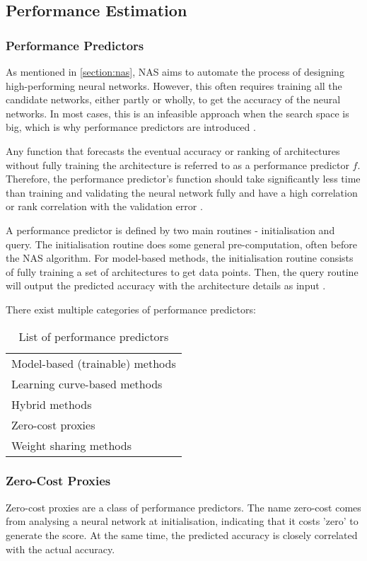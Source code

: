 \subsection{Performance Estimation}
\subsubsection{Performance Predictors}\label{sec:performancepredictors}
As mentioned in \cref{section:nas}, NAS aims to automate the process of designing high-performing neural networks. However, this often requires training all the candidate networks, either partly or wholly, to get the accuracy of the neural networks. In most cases, this is an infeasible approach when the search space is big, which is why performance predictors are introduced \autocite{akhauri2022evolving}. 

Any function that forecasts the eventual accuracy or ranking of architectures without fully training the architecture is referred to as a performance predictor $f$. Therefore, the performance predictor's function should take significantly less time than training and validating the neural network fully and have a high correlation or rank correlation with the validation error \autocite{white2021powerful}. 

A performance predictor is defined by two main routines - initialisation and query. The initialisation routine does some general pre-computation, often before the NAS algorithm. For model-based methods, the initialisation routine consists of fully training a set of architectures to get data points. Then, the query routine will output the predicted accuracy with the architecture details as input \autocite{white2021powerful}. 

There exist multiple categories of performance predictors:

\begin{table}[h]
\caption{List of performance predictors}
\centering
\begin{tabular}{|l}
Model-based (trainable) methods \\
\cellcolor{verylightgray}Learning curve-based methods    \\
Hybrid methods                  \\
\cellcolor{verylightgray}Zero-cost proxies               \\
Weight sharing methods         
\end{tabular}
\end{table}

\subsubsection{Zero-Cost Proxies}\label{subsec:zerocost}
Zero-cost proxies are a class of performance predictors. The name zero-cost comes from analysing a neural network at initialisation, indicating that it costs 'zero' to generate the score. At the same time, the predicted accuracy is closely correlated with the actual accuracy. 

